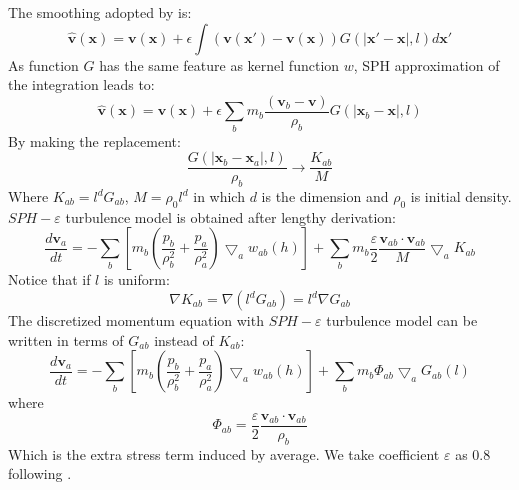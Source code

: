 \documentclass[journal abbreviation, manuscript]{copernicus}
\begin{document}
The smoothing adopted by \citet{monaghan2011turbulence}  is:
\begin{equation}
\widehat{\textbf{v}}\left(\textbf{x}\right)=\textbf{v}\left(\textbf{x}\right)+ \epsilon \int \left(\textbf{v}\left(\textbf{x} \prime\right)-\textbf{v}\left(\textbf{x}\right)\right)G\left(\vert \textbf{x} \prime - \textbf{x} \vert, l\right) d\textbf{x} \prime
\end{equation}
As function $G$ has the same feature as kernel function $w$, SPH approximation of the integration leads to:
\begin{equation} \label{eq:SPH-epsilon-filtering}
\widehat{\textbf{v}}\left(\textbf{x}\right)=\textbf{v}\left(\textbf{x}\right)+\epsilon \sum_b m_b \dfrac{\left(\textbf{v}_b -\textbf{v}\right)}{\rho _b} G\left(\vert \textbf{x} _b - \textbf{x} \vert, l\right)
\end{equation}
By making the replacement:
\begin{equation}
\label{eq:replacement-in-turb-derive}
\dfrac{G\left(\vert \textbf{x} _b - \textbf{x} _a \vert, l\right)}{\rho _b} \rightarrow \dfrac{K_{ab}}{M}
\end{equation}
Where $K_{ab} = l^d G_{ab}$, $M = \rho_0 l^d$ in which $d$ is the dimension and $\rho_0$ is initial density. $SPH-\varepsilon$ turbulence model is obtained after lengthy derivation:
\begin{equation}
\label{eq:monaghan-mom-turb}
\dfrac{d \textbf{v}_a}{dt} = -\sum_b \left[ m_b \left(\dfrac{p_b}{\rho_b^2} + \dfrac{p_a}{\rho_a^2}\right) \bigtriangledown_aw_{a b}\left(h\right)\right] + \sum_b m_b \dfrac{\varepsilon}{2} \dfrac{\textbf{v}_{ab} \cdot \textbf{v}_{ab}}{M} \bigtriangledown_a K_{ab}
\end{equation}
Notice that if $l$ is uniform: 
%
%
\begin{equation}
\nabla K_{ab} = \nabla \left(l^d G_{ab}\right) = l^d \nabla G_{ab}
\end{equation}
The discretized momentum equation with $SPH-\varepsilon$ turbulence model can be written in terms of $G_{ab}$ instead of $K_{ab}$:
\begin{equation}
\label{eq:SPH-mom-epsilon-turb}
\dfrac{d \textbf{v}_a}{dt} = -\sum_b \left[m_b \left(\dfrac{p_b}{\rho_b^2} + \dfrac{p_a}{\rho_a^2}\right) \bigtriangledown_aw_{a b}\left(h\right)\right] + \sum_b m_b \Phi_{ab}\bigtriangledown_aG_{ab}\left(l\right)
\end{equation}
where 
\begin{equation}
\Phi_{ab}=\dfrac{\varepsilon}{2} \dfrac{\textbf{v}_{ab} \cdot \textbf{v}_{ab}}{\rho_b} 
\end{equation}
Which is the extra stress term induced by average. We take coefficient $\varepsilon$ as 0.8 following \citet{monaghan2011turbulence}.
\end{document}

